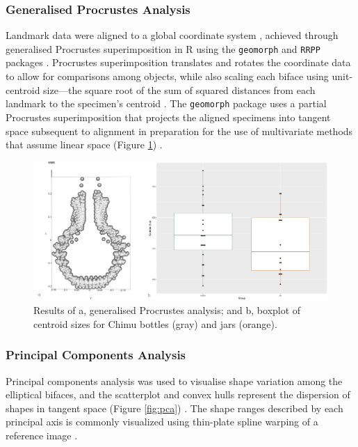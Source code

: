 \documentclass[]{interact}
\theoremstyle{plain}%
\theoremstyle{definition}
\theoremstyle{remark}
\begin{document}
\hypertarget{generalised-procrustes-analysis}{%
\subsubsection{Generalised Procrustes
Analysis}\label{generalised-procrustes-analysis}}

Landmark data were aligned to a global coordinate system
\citep{RN8477,RN7502,RN11622,RN11623,RN11563}, achieved through
generalised Procrustes superimposition \citep{RN11138,RN478,RN1646} in R
using the \texttt{geomorph} and \texttt{RRPP} packages
\citep{RN1655,RN11775,RN11530,RN1774,RN9565}. Procrustes superimposition
translates and rotates the coordinate data to allow for comparisons
among objects, while also scaling each biface using unit-centroid
size---the square root of the sum of squared distances from each
landmark to the specimen's centroid
\citep{RN11139,RN11140,RN11564,RN478}. The \texttt{geomorph} package
uses a partial Procrustes superimposition that projects the aligned
specimens into tangent space subsequent to alignment in preparation for
the use of multivariate methods that assume linear space (Figure
\ref{fig:gpa}) \citep{RN11141,RN11142,RN1646,RN11563}.

\begin{figure}\centering
\includegraphics[width=\linewidth]{figs/gpa.csize.png}
\caption{Results of a, generalised Procrustes analysis; and b, boxplot of centroid sizes for Chimu bottles (gray) and jars (orange).}
\label{fig:gpa}
\end{figure}

\hypertarget{principal-components-analysis}{%
\subsubsection{Principal Components
Analysis}\label{principal-components-analysis}}

Principal components analysis \citep{RN1746} was used to visualise shape
variation among the elliptical bifaces, and the scatterplot and convex
hulls represent the dispersion of shapes in tangent space (Figure
\ref{fig:pca}) \citep{RN8633,RN5616,RN11143,RN7550}. The shape ranges
described by each principal axis is commonly visualized using thin-plate
spline warping of a reference image \citep{RN1731,RN479}.
\end{document}
